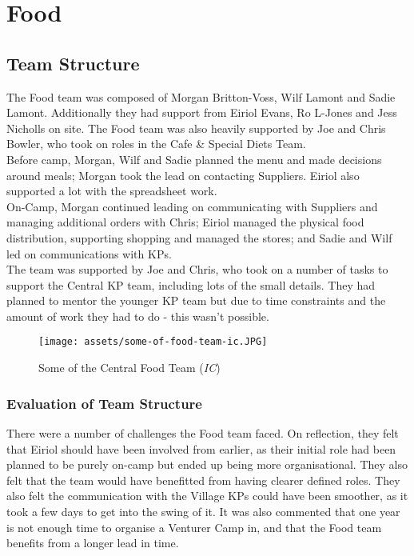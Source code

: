 \chapter{Food}
\section{Team Structure}
The Food team was composed of Morgan Britton-Voss, Wilf Lamont and Sadie Lamont. Additionally they had support from Eiriol Evans, Ro L-Jones and Jess Nicholls on site. The Food team was also heavily supported by Joe and Chris Bowler, who took on roles in the Cafe \& Special Diets Team.\\

Before camp, Morgan, Wilf and Sadie planned the menu and made decisions around meals; Morgan took the lead on contacting Suppliers. Eiriol also supported a lot with the spreadsheet work.\\

On-Camp, Morgan continued leading on communicating with Suppliers and managing additional orders with Chris; Eiriol managed the physical food distribution, supporting shopping and managed the stores; and Sadie and Wilf led on communications with KPs. \\

The team was supported by Joe and Chris, who took on a number of tasks to support the Central KP team, including lots of the small details. They had planned to mentor the younger KP team but due to time constraints and the amount of work they had to do - this wasn't possible.
\begin{figure}[h]
    \centering
    \texttt{[image: assets/some-of-food-team-ic.JPG]}
    \caption{Some of the Central Food Team (\textit{IC})}
\end{figure}
\subsection{Evaluation of Team Structure}
There were a number of challenges the Food team faced. On reflection, they felt that Eiriol should have been involved from earlier, as their initial role had been planned to be purely on-camp but ended up being more organisational. They also felt that the team would have benefitted from having clearer defined roles. They also felt the communication with the Village KPs could have been smoother, as it took a few days to get into the swing of it. It was also commented that one year is not enough time to organise a Venturer Camp in, and that the Food team benefits from a longer lead in time.\\

